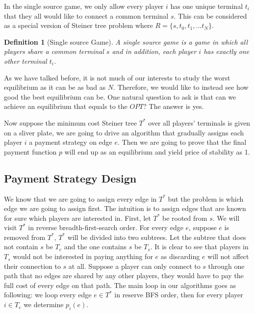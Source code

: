 \documentclass[11pt,psfig,times]{article}
\newtheorem{definition}{Definition}[section]
\begin{document}
In the single source game, we only allow every player \(i\) has one unique terminal \(t_i\)that they all would like to connect a common terminal \(s\). This can be considered as a special version of Steiner tree problem where \(R = \{s,t_0,t_1,...t_N\}\). 

\begin{definition}[Single source Game]
	A single source game is a game in which all players share a common terminal \(s\) and in addition, each player \(i\) has exactly one other terminal \(t_i\).
\end{definition}

As we have talked before, it is not much of our interests to study the worst equilibrium as it can be as bad as $N$. Therefore, we would like to instead see how good the best equilibrium can be. One natural question to ask is that can we achieve an equilibrium that equals to the \(OPT\)? The answer is yes.

Now suppose the minimum cost Steiner tree \(T^*\) over all players' terminals is given on a sliver plate, we are going to drive an algorithm that gradually assigns each player \(i\) a payment strategy on edge \(e\). Then we are going to prove that the final payment function \(p\) will end up as an equilibrium and yield price of stability as 1.  

\subsection{Payment Strategy Design}
We know that we are going to assign every edge in \(T^*\) but the problem is which edge we are going to assign first. The intuition is to assign edges that are known for sure which players are interested in. First, let \(T^*\) be rooted from \(s\). We will visit \(T^*\) in reverse breadth-first-search order. For every edge \(e\), suppose \(e\) is removed from \(T^*\), \(T^*\) will be divided into two subtrees. Let the subtree that does not contain \(s\) be \(T_e\) and the one contains \(s\) be \(T_s\). It is clear to see that players in \(T_s\) would not be interested in paying anything for \(e\) as discarding \(e\) will not affect their connection to \(s\) at all. Suppose a player can only connect to \(s\) through one path that no edges are shared by any other players, they would have to pay the full cost of every edge on that path. The main loop in our algorithms goes as following: we loop every edge \(e \in T^*\) in reserve BFS order, then for every player \(i \in T_e\) we determine \(p_i(e)\).
\end{document}
